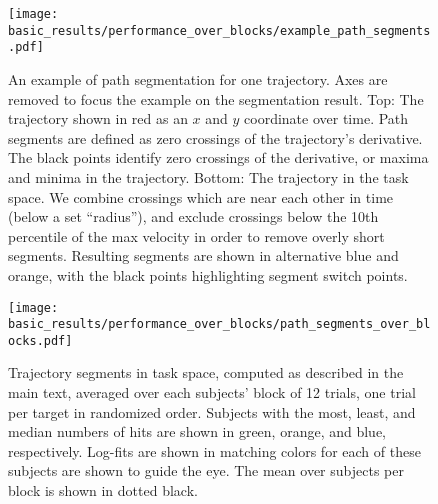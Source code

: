 \documentclass[../main.tex]{subfiles}
\begin{document}
\begin{figure}[!htb]%
    \centering
    \texttt{[image: basic\_results/performance\_over\_blocks/example\_path\_segments.pdf]}
    \caption[Example of a path segmented trial]{An example of path segmentation for one trajectory. Axes are removed to focus the example on the segmentation result. Top: The trajectory shown in red as an $x$ and $y$ coordinate over time. Path segments are defined as zero crossings of the trajectory's derivative. The black points identify zero crossings of the derivative, or maxima and minima in the trajectory. Bottom: The trajectory in the task space. We combine crossings which are near each other in time (below a set ``radius''), and exclude crossings below the 10th percentile of the max velocity in order to remove overly short segments. Resulting segments are shown in alternative blue and orange, with the black points highlighting segment switch points.}\label{fig:example_segments}
\end{figure}

\begin{figure}[!htb]%
    \centering
    \texttt{[image: basic\_results/performance\_over\_blocks/path\_segments\_over\_blocks.pdf]}
    \caption[Trajectory segments over blocks]{Trajectory segments in task space, computed as described in the main text, averaged over each subjects' block of 12 trials, one trial per target in randomized order. Subjects with the most, least, and median numbers of hits are shown in green, orange, and blue, respectively. Log-fits are shown in matching colors for each of these subjects are shown to guide the eye. The mean over subjects per block is shown in dotted black.}\label{fig:path_segments_over_blocks}
\end{figure}

\end{document}
